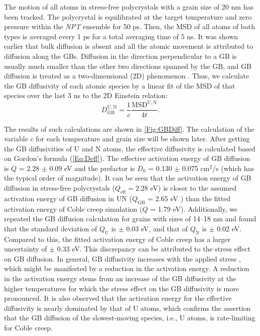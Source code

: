 \documentclass[preprint,12pt,sort&compress]{elsarticle} %
\newcommand{\?}{\stackrel{?}{=}}
\providecommand{\DIFaddbegin}{\protect\color{blue}} %
\providecommand{\DIFaddend}{\protect\color{black}} %
\providecommand{\DIFdelbegin}{\protect\color{red}} %
\providecommand{\DIFdelend}{\protect\color{black}} %
\newcommand{\DIFscaledelfig}{0.5}
\newlength{\DIFdelgraphicswidth} %
\newlength{\DIFdelgraphicsheight} %
\newcommand{\DIFaddincludegraphics}[2][]{{\color{blue}\fbox{\DIFOincludegraphics[#1]{#2}}}} %
\newcommand{\DIFdelincludegraphics}[2][]{%
\sbox{\DIFdelgraphicsbox}{\DIFOincludegraphics[#1]{#2}}%
\settoboxwidth{\DIFdelgraphicswidth}{\DIFdelgraphicsbox} %
\settoboxtotalheight{\DIFdelgraphicsheight}{\DIFdelgraphicsbox} %
\scalebox{\DIFscaledelfig}{%
\parbox[b]{\DIFdelgraphicswidth}{\usebox{\DIFdelgraphicsbox}\\[-\baselineskip] \rule{\DIFdelgraphicswidth}{0em}}\llap{\resizebox{\DIFdelgraphicswidth}{\DIFdelgraphicsheight}{%
\setlength{\unitlength}{\DIFdelgraphicswidth}%
\begin{picture}(1,1)%
\thicklines\linethickness{2pt} %
{\color[rgb]{1,0,0}\put(0,0){\framebox(1,1){}}}%
{\color[rgb]{1,0,0}\put(0,0){\line( 1,1){1}}}%
{\color[rgb]{1,0,0}\put(0,1){\line(1,-1){1}}}%
\end{picture}%
}\hspace*{3pt}}} %
} %
\DeclareRobustCommand{\DIFaddbegin}{\DIFOaddbegin \let\includegraphics\DIFaddincludegraphics} %
\DeclareRobustCommand{\DIFaddend}{\DIFOaddend \let\includegraphics\DIFOincludegraphics} %
\DeclareRobustCommand{\DIFdelbegin}{\DIFOdelbegin \let\includegraphics\DIFdelincludegraphics} %
\DeclareRobustCommand{\DIFdelend}{\DIFOaddend \let\includegraphics\DIFOincludegraphics} %
\begin{document}
The motion of all atoms in stress-free polycrystals with a grain size of 20 nm has been tracked. The polycrystal is equilibrated at the target temperature and zero pressure within the \textit{NPT} ensemble for 50 ps. Then, the MSD of all atoms of both types is averaged every 1 ps for a total averaging time of 5 ns. It was shown earlier that bulk diffusion is absent and all the atomic movement is attributed to diffusion along the GBs. Diffusion in the direction perpendicular to a GB is usually much smaller than the other two directions spanned by the GB, and GB diffusion is treated as a two-dimensional (2D) phenomenon \cite{Riet2021}. Thus, we calculate the GB diffusivity of each atomic species by a linear fit of the MSD of that species over the last 3 ns to the 2D Einstein relation:
\DIFdelbegin %
\DIFdelend \DIFaddbegin \begin{equation}
D_\mathrm{GB}^\mathrm{U, N} = \frac{1}{c} \frac{\mathrm{MSD^\mathrm{U, N}}}{4 t}.
\label{Eq:GBD}
\end{equation}\DIFaddend 

The results of such calculations are shown in \cref{Fig:GBDiff}. The calculation of the variable $c$ for each temperature and grain size will be shown later. After getting the GB diffusivities of U and N atoms, the effective diffusivity is calculated based on Gordon's formula (\cref{Eq:Deff}). The effective activation energy of GB diffusion is $Q$ = 2.28 $\pm$ 0.09 eV and the prefactor is $D_0$ = 0.130 $\pm$ 0.075 cm$^2$/s (which has the typical order of magnitude). It can be seen that the activation energy of GB diffusion in stress-free polycrystals ($Q_{\mathrm{eff}} = 2.28$ eV) is closer to the assumed activation energy of GB diffusion in UN ($Q_\mathrm{GB}$ = 2.65 eV \cite{Konovalov2016}) than the fitted activation energy of Coble creep simulation ($Q$ = 1.79 eV). Additionally, we repeated the GB diffusion calculation for grains with sizes of 14--18 nm and found that the standard deviation of $Q_\mathrm{U}$ is $\pm$ 0.03 eV, and that of $Q_\mathrm{N}$ is $\pm$ 0.02 eV. Compared to this, the fitted activation energy of Coble creep has a larger uncertainty of $\pm$ 0.33 eV. This discrepancy can be attributed to the stress effect on GB diffusion. In general, GB diffusivity increases with the applied stress \cite{Haslam2004}, which might be manifested by a reduction in the activation energy. A reduction in the activation energy stems from an increase of the GB diffusivity at the higher temperatures for which the stress effect on the GB diffusivity is more pronounced. It is also observed that the activation energy for the effective diffusivity is nearly dominated by that of U atoms, which confirms the assertion that the GB diffusion of the slowest-moving species, i.e., U atoms, is rate-limiting for Coble creep. 
\end{document}
